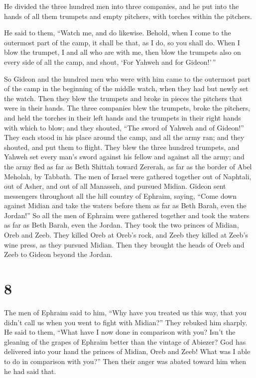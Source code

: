  He divided the three hundred men into three companies,
and he put into the hands of all them trumpets and empty pitchers, with
torches within the pitchers.

 He said to them, ``Watch me, and do likewise. Behold,
when I come to the outermost part of the camp, it shall be that, as I
do, so you shall do.  When I blow the trumpet, I and all
who are with me, then blow the trumpets also on every side of all the
camp, and shout, `For Yahweh and for Gideon!'\,''

 So Gideon and the hundred men who were with him came to
the outermost part of the camp in the beginning of the middle watch,
when they had but newly set the watch. Then they blew the trumpets and
broke in pieces the pitchers that were in their hands. 
The three companies blew the trumpets, broke the pitchers, and held the
torches in their left hands and the trumpets in their right hands with
which to blow; and they shouted, ``The sword of Yahweh and of Gideon!''
 They each stood in his place around the camp, and all
the army ran; and they shouted, and put them to flight. 
They blew the three hundred trumpets, and Yahweh set every man's sword
against his fellow and against all the army; and the army fled as far as
Beth Shittah toward Zererah, as far as the border of Abel Meholah, by
Tabbath.  The men of Israel were gathered together out of
Naphtali, out of Asher, and out of all Manasseh, and pursued Midian.
 Gideon sent messengers throughout all the hill country
of Ephraim, saying, ``Come down against Midian and take the waters
before them as far as Beth Barah, even the Jordan!'' So all the men of
Ephraim were gathered together and took the waters as far as Beth Barah,
even the Jordan.  They took the two princes of Midian,
Oreb and Zeeb. They killed Oreb at Oreb's rock, and Zeeb they killed at
Zeeb's wine press, as they pursued Midian. Then they brought the heads
of Oreb and Zeeb to Gideon beyond the Jordan.

\hypertarget{section-7}{%
\section{8}\label{section-7}}

 The men of Ephraim said to him, ``Why have you treated us
this way, that you didn't call us when you went to fight with Midian?''
They rebuked him sharply.  He said to them, ``What have I
now done in comparison with you? Isn't the gleaning of the grapes of
Ephraim better than the vintage of Abiezer?  God has
delivered into your hand the princes of Midian, Oreb and Zeeb! What was
I able to do in comparison with you?'' Then their anger was abated
toward him when he had said that.

